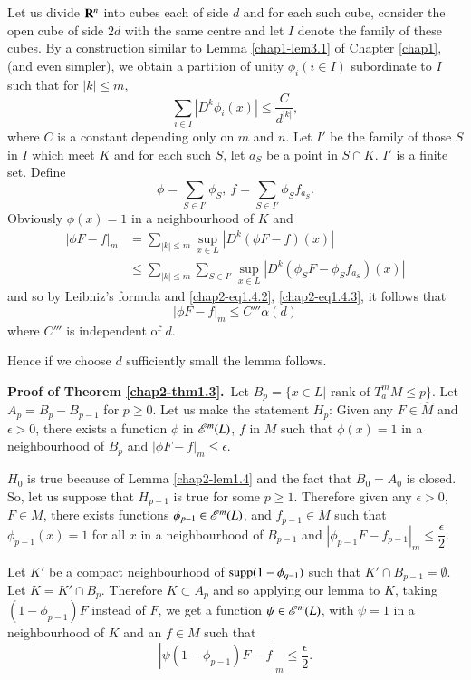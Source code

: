 Let us divide $\mathbf{R}^{n}$ into cubes each of side $d$ and for each such cube, consider the open cube of side $2d$ with the same centre and let $I$ denote the family of these cubes. By a construction similar to Lemma \ref{chap1-lem3.1} of Chapter \ref{chap1}, (and even simpler), we obtain a partition of unity $\phi_{i}(i\in I)$ subordinate to $I$ such that for $|k|\leq m$,
\begin{equation*}
\sum\limits_{i\in I}|D^{k}\phi_{i}(x)|\leq \dfrac{C}{d^{|k|}},\tag{1.4.3}\label{chap2-eq1.4.3}
\end{equation*}
where $C$ is a constant depending only on $m$ and $n$. Let $I'$ be the family of those $S$ in $I$ which meet $K$ and for each such $S$, let $a_{S}$ be a point in $S\cap K$. $I'$ is a finite set. Define
$$
\phi=\sum\limits_{S\in I'}\phi_{S}, \ f=\sum\limits_{S\in I'}\phi_{S}f_{a_{S}}.
$$
Obviously $\phi(x)=1$ in a neighbourhood of $K$ and 
\begin{align*}
|\phi F-f|_{m} &= \sum\limits_{|k|\leq m}\sup\limits_{x\in L}|D^{k}(\phi F-f)(x)|\\
&\leq \sum\limits_{|k|\leq m}\sum\limits_{S\in I'}\sup\limits_{x\in L}|D^{k}(\phi_{S}F-\phi_{S}f_{a_{S}})(x)|
\end{align*}
and so by Leibniz's formula and \eqref{chap2-eq1.4.2}, \eqref{chap2-eq1.4.3}, it follows that
$$
|\phi F-f|_{m}\leq C''' \alpha(d)
$$
where $C'''$ is independent of $d$.

Hence if we choose $d$ sufficiently small the lemma follows.

\medskip
\noindent
{\bf Proof of Theorem \ref{chap2-thm1.3}.}~Let $B_{p}=\{x\in L|\text{~rank of~}T^{m}_{a}M\leq p\}$. Let $A_{p}=B_{p}-B_{p-1}$ for $p\geq 0$. Let us make the statement $H_{p}$: Given any $F\in\widehat{M}$ and $\epsilon>0$, there exists a function $\phi$ in $\mathscr{E}^{m}(L)$, $f$ in $M$ such that $\phi(x)=1$ in a neighbourhood of $B_{p}$ and $|\phi F-f|_{m}\leq \epsilon$.

$H_{0}$ is true because of Lemma \ref{chap2-lem1.4} and the fact that $B_{0}=A_{0}$ is closed. So, let us suppose that $H_{p-1}$ is true for some $p\geq 1$. Therefore given any $\epsilon>0$, $F\in M$, there exists functions $\phi_{p-1}\in \mathscr{E}^{m}(L)$, and $f_{p-1}\in M$ such that $\phi_{p-1}(x)=1$ for all $x$ in a neighbourhood of $B_{p-1}$ and $|\phi_{p-1}F-f_{p-1}|_{m}\leq \dfrac{\epsilon}{2}$.

Let $K'$ be a compact neighbourhood of $\operatorname{supp} (1-\phi_{q-1})$ such that $K'\cap B_{p-1}=\emptyset$. Let $K=K'\cap B_{p}$. Therefore $K\subset A_{p}$ and so applying our lemma to $K$, taking $(1-\phi_{p-1})F$ instead of $F$, we get a function $\psi\in \mathscr{E}^{m}(L)$, with $\psi=1$ in a neighbourhood of $K$ and an $f\in M$ such that
$$
|\psi(1-\phi_{p-1})F-f|_{m}\leq \dfrac{\epsilon}{2}.
$$

